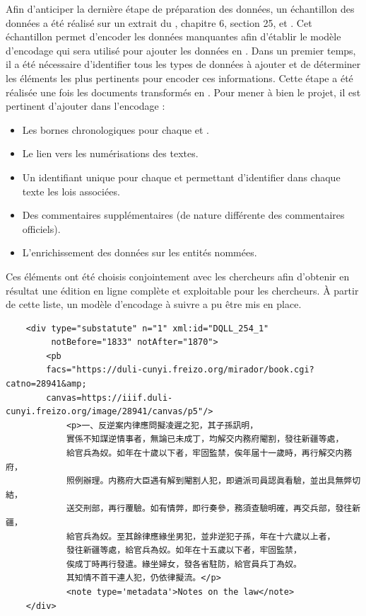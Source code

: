 Afin d'anticiper la dernière étape de préparation des données, un échantillon des données a été réalisé sur un extrait du \dc, chapitre 6, section 25,  et . Cet échantillon permet d'encoder les données manquantes afin d'établir le modèle d'encodage qui sera utilisé pour ajouter les données \JSON en \TEI. Dans un premier temps, il a été nécessaire d'identifier tous les types de données à ajouter et de déterminer les éléments \TEI les plus pertinents pour encoder ces informations. Cette étape a été réalisée une fois les documents \XML transformés en \TEI. Pour mener à bien le projet, il est pertinent d'ajouter dans l'encodage : 
\begin{itemize}
    \item Les bornes chronologiques pour chaque \lu et \li.
    \item Le lien vers les numérisations des textes.
    \item Un identifiant unique pour chaque \lu et \li permettant d'identifier dans chaque texte les lois associées.
    \item Des commentaires supplémentaires (de nature différente des commentaires officiels).
    \item L'enrichissement des données sur les entités nommées.
\end{itemize}

Ces éléments ont été choisis conjointement avec les chercheurs afin d'obtenir en résultat une édition en ligne complète et exploitable pour les chercheurs. À partir de cette liste, un modèle d'encodage à suivre a pu être mis en place. 

\begin{verbatim}
    <div type="substatute" n="1" xml:id="DQLL_254_1" 
         notBefore="1833" notAfter="1870">
        <pb  
        facs="https://duli-cunyi.freizo.org/mirador/book.cgi?catno=28941&amp;
        canvas=https://iiif.duli-cunyi.freizo.org/image/28941/canvas/p5"/>
            <p>一、反逆案内律應問擬凌遲之犯，其子孫訊明，
            實係不知謀逆情事者，無論已未成丁，均解交内務府閹割，發往新疆等處，
            給官兵為奴。如年在十歲以下者，牢固監禁，俟年届十一歲時，再行解交内務府，
            照例辦理。内務府大臣遇有解到閹割人犯，即遴派司員認眞看驗，並出具無弊切結，
            送交刑部，再行覆驗。如有情弊，即行奏參，務須查驗明確，再交兵部，發往新疆，
            給官兵為奴。至其餘律應緣坐男犯，並非逆犯子孫，年在十六歲以上者，
            發往新疆等處，給官兵為奴。如年在十五歲以下者，牢固監禁，
            俟成丁時再行發遣。緣坐婦女，發各省駐防，給官員兵丁為奴。
            其知情不首干連人犯，仍依律擬流。</p>
            <note type='metadata'>Notes on the law</note>
    </div>
\end{verbatim}

